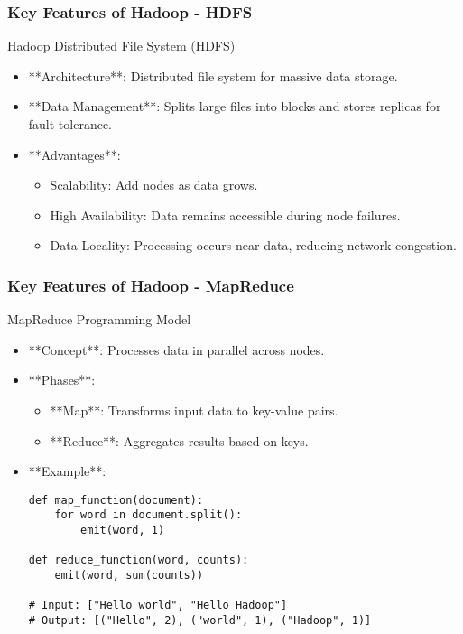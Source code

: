 \documentclass{beamer}
\begin{document}
\begin{frame}
    \frametitle{Key Features of Hadoop - HDFS}
    \begin{block}{Hadoop Distributed File System (HDFS)}
        \begin{itemize}
            \item **Architecture**: Distributed file system for massive data storage.
            \item **Data Management**: Splits large files into blocks and stores replicas for fault tolerance.
            \item **Advantages**:
            \begin{itemize}
                \item Scalability: Add nodes as data grows.
                \item High Availability: Data remains accessible during node failures.
                \item Data Locality: Processing occurs near data, reducing network congestion.
            \end{itemize}
        \end{itemize}
    \end{block}
\end{frame}

\begin{frame}[fragile]
    \frametitle{Key Features of Hadoop - MapReduce}
    \begin{block}{MapReduce Programming Model}
        \begin{itemize}
            \item **Concept**: Processes data in parallel across nodes.
            \item **Phases**:
            \begin{itemize}
                \item **Map**: Transforms input data to key-value pairs.
                \item **Reduce**: Aggregates results based on keys.
            \end{itemize}
            \item **Example**:
            \begin{lstlisting}
def map_function(document):
    for word in document.split():
        emit(word, 1)

def reduce_function(word, counts):
    emit(word, sum(counts))

# Input: ["Hello world", "Hello Hadoop"]
# Output: [("Hello", 2), ("world", 1), ("Hadoop", 1)]
            \end{lstlisting}
        \end{itemize}
    \end{block}
\end{frame}
\end{document}
